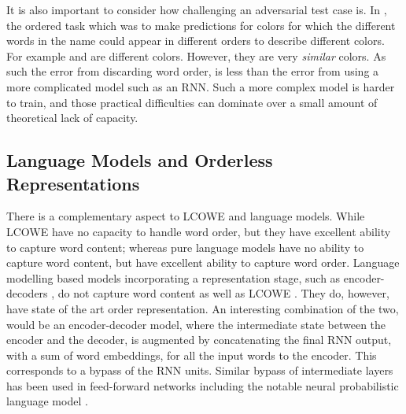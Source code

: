 \documentclass{book}
\begin{document}
It is also important to consider how challenging an adversarial test case is.
In , the ordered task which was to make predictions for colors for which the different words in the name could appear in different orders to describe different colors.
For example  and  are different colors.
However, they are very \emph{similar} colors.
As such the error from discarding word order, is less than the error from using a more complicated model such as an RNN.
Such a more complex model is harder to train, and those practical difficulties can dominate over a small amount of theoretical lack of capacity.



\subsection{Language Models and Orderless Representations}

There is a complementary aspect to LCOWE and language models.
While LCOWE have no capacity to handle word order, but they have excellent ability to capture word content;
whereas pure language models have no ability to capture word content, but have excellent ability to capture word order.
Language modelling based models incorporating a representation stage, such as encoder-decoders \citep{cho-EtAl:2014:EMNLP2014}, do not capture word content as well as LCOWE \citep{ac2018probingsentencevectors}.
They do, however, have state of the art order representation.
An interesting combination of the two,
would be an encoder-decoder model,
where the intermediate state between the encoder and the decoder,
is augmented by concatenating the final RNN output, with a sum of word embeddings, for all the input words to the encoder.
This corresponds to a bypass of the RNN units.
Similar bypass of intermediate layers has been used in feed-forward networks including the notable neural probabilistic language model \citep{NPLM}.
\end{document}
